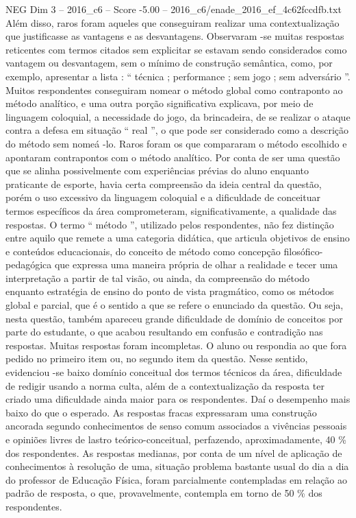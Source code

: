 \begin{textsample}{NEG Dim 3 – 2016\_c6 – Score -5.00 – 2016\_c6/enade\_2016\_ef\_4c62fccdfb.txt}
Além disso, raros foram aqueles que conseguiram realizar uma contextualização que justificasse as vantagens e as desvantagens.
Observaram -se muitas respostas reticentes com termos citados sem explicitar se estavam sendo considerados como vantagem ou desvantagem, sem o mínimo de construção semântica, como, por exemplo, apresentar a lista : “ técnica ; performance ; sem jogo ; sem adversário ”.
Muitos respondentes conseguiram nomear o método global como contraponto ao método analítico, e uma outra porção significativa explicava, por meio de linguagem coloquial, a necessidade do jogo, da brincadeira, de se realizar o ataque contra a defesa em situação “ real ”, o que pode ser considerado como a descrição do método sem nomeá -lo.
Raros foram os que compararam o método escolhido e apontaram contrapontos com o método analítico.
Por conta de ser uma questão que se alinha possivelmente com experiências prévias do aluno enquanto praticante de esporte, havia certa compreensão da ideia central da questão, porém o uso excessivo da linguagem coloquial e a dificuldade de conceituar termos específicos da área comprometeram, significativamente, a qualidade das respostas.
O termo “ método ”, utilizado pelos respondentes, não fez distinção entre aquilo que remete a uma categoria didática, que articula objetivos de ensino e conteúdos educacionais, do conceito de método como concepção filosófico-pedagógica que expressa uma maneira própria de olhar a realidade e tecer uma interpretação a partir de tal visão, ou ainda, da compreensão do método enquanto estratégia de ensino do ponto de vista pragmático, como os métodos global e parcial, que é o sentido a que se refere o enunciado da questão.
Ou seja, nesta questão, também apareceu grande dificuldade de domínio de conceitos por parte do estudante, o que acabou resultando em confusão e contradição nas respostas.
Muitas respostas foram incompletas.
O aluno ou respondia ao que fora pedido no primeiro item ou, no segundo item da questão.
Nesse sentido, evidenciou -se baixo domínio conceitual dos termos técnicos da área, dificuldade de redigir usando a norma culta, além de a contextualização da resposta ter criado uma dificuldade ainda maior para os respondentes.
Daí o desempenho mais baixo do que o esperado.
As respostas fracas expressaram uma construção ancorada segundo conhecimentos de senso comum associados a vivências pessoais e opiniões livres de lastro teórico-conceitual, perfazendo, aproximadamente, 40 \% dos respondentes.
As respostas medianas, por conta de um nível de aplicação de conhecimentos à resolução de uma, situação problema bastante usual do dia a dia do professor de Educação Física, foram parcialmente contempladas em relação ao padrão de resposta, o que, provavelmente, contempla em torno de 50 \% dos respondentes.

\end{textsample}
